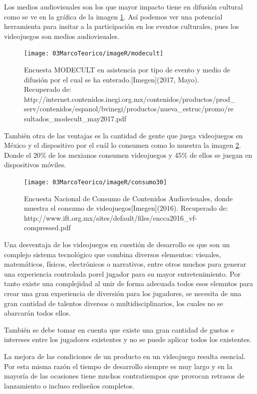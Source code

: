 Los medios audiovisuales son los que mayor impacto tiene en difusión cultural como se ve en la gráfica de la imagen \ref{fig:modecult}. Así podemos ver una potencial herramienta para insitar a la participación en los eventos culturales, pues los videojuegos son medios audiovisuales.
\\[1pt]

\begin{figure}
	\centering 
	\texttt{[image: 03MarcoTeorico/imageR/modecult]}
	\caption{Encuesta MODECULT en asistencia por tipo de evento y medio de difusión por el cual se ha enterado.[Imegen](2017, Mayo). Recuperado de: http://internet.contenidos.inegi.org.mx/contenidos/productos/prod\_serv/contenidos/espanol/bvinegi/productos/nueva\_estruc/promo/resultados\_modecult\_may2017.pdf}
	\label{fig:modecult}
\end{figure}

También otra de las ventajas es la cantidad de gente que juega videojuegos en México y el dispositivo por el cuál lo consumen como lo muestra la imagen \ref{fig:consumo30}. Donde el 20\% de los mexianos consumen videojuegos y 45\% de ellos se juegan en dispositivos móviles.

\begin{figure}
	\centering 
	\texttt{[image: 03MarcoTeorico/imageR/consumo30]}
	\caption{Encuesta Nacional de Consumo de Contenidos Audiovisuales, donde muestra el consumo de videojuegos[Imegen](2016). Recuperado de: http://www.ift.org.mx/sites/default/files/encca2016\_vf-compressed.pdf}
	\label{fig:consumo30}
\end{figure}


Una desventaja de los videojuegos en cuestión de desarrollo es que son un complejo sistema tecnológico que combina diversos elementos: visuales, matemáticos, físicos, electrónicos o narrativos, entre otros muchos para generar una experiencia controlada porel jugador para su mayor entretenimiento. Por tanto existe una complejidad al unir de forma adecuada todos esos elemntos para crear una gran experiencia de diversión para los jugadores, se necesita de una gran cantidad de talentos diversos o multidisciplinarios, los cuales no se abarcarán todos ellos.

También se debe tomar en cuenta que existe una gran cantidad de gustos e intereses entre los jugadores existentes y no se puede aplicar todos los existentes.

La mejora de las condiciones de un producto en un videojuego resulta esencial. Por esta misma razón el tiempo de desarrollo siempre es muy largo y en la mayoría de las ocasiones tiene muchos contratiempos que provocan retrasos de lanzamiento o incluso rediseños completos.



